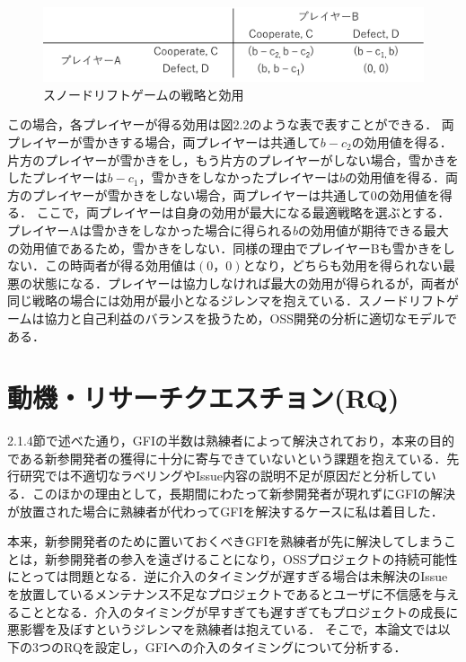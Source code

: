 \documentclass[11pt]{jreport}
\begin{document}
\begin{figure}[H]
\centerline{\includegraphics[width=0.9\linewidth]{@BSthesis2024_Nakai/BSthesis2024_Nakai_fig/snowdrift.png}}
\caption{スノードリフトゲームの戦略と効用}
\label{fig:milestone}
\end{figure}

この場合，各プレイヤーが得る効用は図2.2のような表で表すことができる．
両プレイヤーが雪かきする場合，両プレイヤーは共通して$b - c_2$の効用値を得る．片方のプレイヤーが雪かきをし，もう片方のプレイヤーがしない場合，雪かきをしたプレイヤーは$b - c_1$，雪かきをしなかったプレイヤーは$b$の効用値を得る．両方のプレイヤーが雪かきをしない場合，両プレイヤーは共通して$0$の効用値を得る．
ここで，両プレイヤーは自身の効用が最大になる最適戦略を選ぶとする．プレイヤーAは雪かきをしなかった場合に得られる$b$の効用値が期待できる最大の効用値であるため，雪かきをしない．同様の理由でプレイヤーBも雪かきをしない．この時両者が得る効用値は$(0， 0)$となり，どちらも効用を得られない最悪の状態になる．プレイヤーは協力しなければ最大の効用が得られるが，両者が同じ戦略の場合には効用が最小となるジレンマを抱えている．スノードリフトゲームは協力と自己利益のバランスを扱うため，OSS開発の分析に適切なモデルである．


\section{動機・リサーチクエスチョン(RQ)}

2.1.4節で述べた通り，GFIの半数は熟練者によって解決されており，本来の目的である新参開発者の獲得に十分に寄与できていないという課題を抱えている．先行研究\cite{GFI}\cite{GFI_half}では不適切なラベリングやIssue内容の説明不足が原因だと分析している．このほかの理由として，長期間にわたって新参開発者が現れずにGFIの解決が放置された場合に熟練者が代わってGFIを解決するケースに私は着目した．

本来，新参開発者のために置いておくべきGFIを熟練者が先に解決してしまうことは，新参開発者の参入を遠ざけることになり，OSSプロジェクトの持続可能性にとっては問題となる．逆に介入のタイミングが遅すぎる場合は未解決のIssueを放置しているメンテナンス不足なプロジェクトであるとユーザに不信感を与えることとなる．介入のタイミングが早すぎても遅すぎてもプロジェクトの成長に悪影響を及ぼすというジレンマを熟練者は抱えている．
そこで，本論文では以下の3つのRQを設定し，GFIへの介入のタイミングについて分析する．
\end{document}
